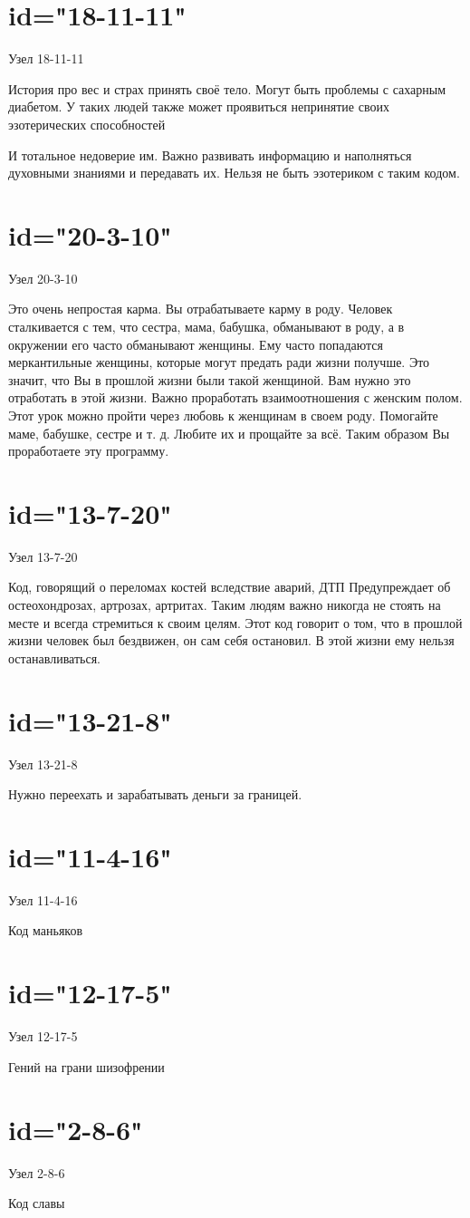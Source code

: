 \section{id="18-11-11"}{Узел 18-11-11}
\item История про вес и страх принять своё тело. Могут быть 
проблемы с сахарным диабетом. У таких людей также может 
проявиться непринятие своих эзотерических способностей
\item И тотальное недоверие им. Важно развивать информацию и 
наполняться духовными знаниями и передавать их. Нельзя не быть 
эзотериком с таким кодом.
\endsection

\section{id="20-3-10"}{Узел 20-3-10}
\item Это очень непростая карма. Вы отрабатываете карму в роду. 
Человек сталкивается с тем, что сестра, мама, бабушка, обманывают 
в роду, а в окружении его часто обманывают женщины. Ему часто 
попадаются меркантильные женщины, которые могут предать ради 
жизни получше. Это значит, что Вы в прошлой жизни были такой 
женщиной. Вам нужно это отработать в этой жизни. Важно 
проработать взаимоотношения с женским полом. Этот урок можно 
пройти через любовь к женщинам в своем роду. Помогайте маме, 
бабушке, сестре и т. д. Любите их и прощайте за всё. Таким 
образом Вы проработаете эту программу.
\endsection

\section{id="13-7-20"}{Узел 13-7-20}
\item Код, говорящий о переломах костей вследствие аварий, ДТП 
Предупреждает об остеохондрозах, артрозах, артритах. Таким 
людям важно никогда не стоять на месте и всегда стремиться к 
своим целям. Этот код говорит о том, что в прошлой жизни человек 
был бездвижен, он сам себя остановил. В этой жизни ему нельзя 
останавливаться.
\endsection

\section{id="13-21-8"}{Узел 13-21-8}
\item Нужно переехать и зарабатывать деньги за границей.
\endsection

\section{id="11-4-16"}{Узел 11-4-16}
\item Код маньяков
\endsection

\section{id="12-17-5"}{Узел 12-17-5}
\item Гений на грани шизофрении
\endsection

\section{id="2-8-6"}{Узел 2-8-6}
\item Код славы
\endsection
